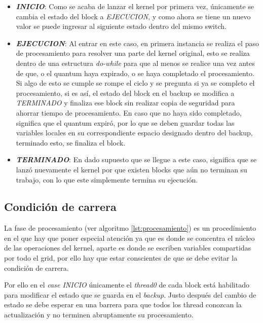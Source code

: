 \begin{itemize}
\item \textit{\textbf{INICIO}}: Como se acaba de lanzar el kernel por primera vez, únicamente se cambia el estado del block a \textit{EJECUCION}, y como ahora se tiene un nuevo valor se puede ingresar al siguiente estado dentro del mismo switch.

\item \textit{\textbf{EJECUCION}}: Al entrar en este caso, en primera instancia se realiza el paso de procesamiento para resolver una parte del kernel original, esto se realiza dentro de una estructura \textit{do-while} para que al menos se realice una vez antes de que, o el quantum haya expirado, o se haya completado el procesamiento. Si algo de esto se cumple se rompe el ciclo y se pregunta si ya se completo el procesamiento, si es así, el estado del block en el backup se modifica a \textit{TERMINADO} y finaliza ese block sin realizar copia de seguridad para ahorrar tiempo de procesamiento.
En caso que no haya sido completado, significa que el quantum expiró, por lo que se deben guardar todas las variables locales en su correspondiente espacio designado dentro del backup, terminado esto, se finaliza el block.

\item \textit{\textbf{TERMINADO}}: En dado supuesto que se llegue a este caso, significa que se lanzó nuevamente el kernel por que existen blocks que aún no terminan su trabajo, con lo que este simplemente termina su ejecución.
\end{itemize}



\subsection{Condición de carrera}

La fase de procesamiento (ver algoritmo \ref{lst:procesamiento}) es un procedimiento en el que hay que poner especial atención ya que es donde se concentra el núcleo de las operaciones del kernel, aparte es donde se escriben variables compartidas por todo el grid, por ello hay que estar conscientes de que se debe evitar la condición de carrera.
\newline

Por ello en el \textit{case INICIO} únicamente el \textit{thread0} de cada block está habilitado para modificar el estado que se guarda en el \textit{backup}. Justo después del cambio de estado se debe esperar en una barrera para que todos los thread conozcan la actualización y no terminen abruptamente su procesamiento.
\newline

